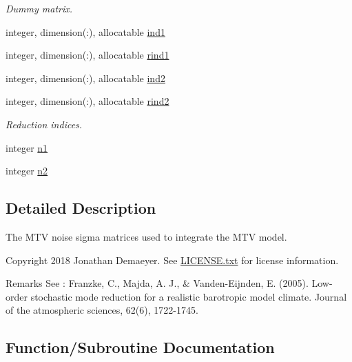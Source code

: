 \begin{DoxyCompactItemize}
\begin{DoxyCompactList}\small\item\em Dummy matrix. \end{DoxyCompactList}\item 
integer, dimension(\+:), allocatable \hyperlink{namespacesigma_a3f8dbbf3b119812ecc38f3e2cb0dcdf2}{ind1}
\item 
integer, dimension(\+:), allocatable \hyperlink{namespacesigma_ae2753201d5fd5cf3ab0d5b103b9eb27a}{rind1}
\item 
integer, dimension(\+:), allocatable \hyperlink{namespacesigma_a5f8dd1d30a05aa1b77988cf43e9664bb}{ind2}
\item 
integer, dimension(\+:), allocatable \hyperlink{namespacesigma_afd4965b46adc2446101f6f3bf072e28f}{rind2}
\begin{DoxyCompactList}\small\item\em Reduction indices. \end{DoxyCompactList}\item 
integer \hyperlink{namespacesigma_a99bf91cd11d1a6d59216fceee65b9b4b}{n1}
\item 
integer \hyperlink{namespacesigma_a4019bcd3294851992406e2f6a284413b}{n2}
\end{DoxyCompactItemize}


\subsection{Detailed Description}
The M\+TV noise sigma matrices used to integrate the M\+TV model. 

\begin{DoxyCopyright}{Copyright}
2018 Jonathan Demaeyer. See \hyperlink{LICENSE_8txt}{L\+I\+C\+E\+N\+S\+E.\+txt} for license information. 
\end{DoxyCopyright}
\begin{DoxyRemark}{Remarks}
See \+: Franzke, C., Majda, A. J., \& Vanden-\/\+Eijnden, E. (2005). Low-\/order stochastic mode reduction for a realistic barotropic model climate. Journal of the atmospheric sciences, 62(6), 1722-\/1745. 
\end{DoxyRemark}


\subsection{Function/\+Subroutine Documentation}
